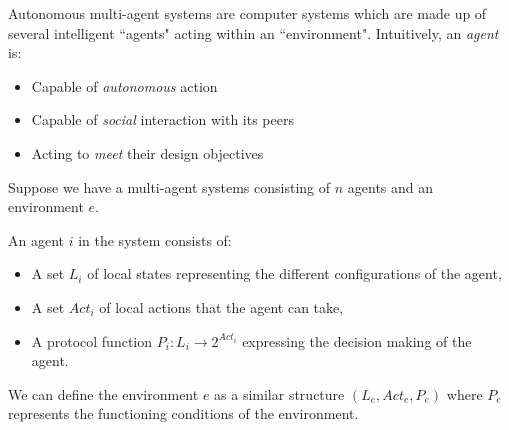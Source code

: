 \documentclass[12]{article}
\newenvironment{definition}[1][Definition]{\begin{trivlist}
\item[\hskip \labelsep {\bfseries #1}]}{\end{trivlist}}
\begin{document}
Autonomous multi-agent systems are computer systems which are made up of several intelligent ``agents" acting within an ``environment". 
Intuitively, an \textit{agent} is: 
\begin{itemize}
\item Capable of \textit{autonomous} action 
\item Capable of \textit{social} interaction with its peers
\item Acting to \textit{meet} their design objectives 
\end{itemize}
 
Suppose we have a multi-agent systems consisting of $n$ agents and an environment $e$.
\begin{definition} 
An agent $i$ in the system consists of: 
\begin{itemize}
\item A set $L_i$ of local states representing the different configurations of the agent,
\item A set $Act_i$ of local actions that the agent can take,
\item A protocol function $P_i : L_i \rightarrow 2^{Act_i} $ expressing the decision making of the agent.
\end{itemize} 
\end{definition}

We can define the environment $e$ as a similar structure $(L_e, Act_e, P_e)$ where $P_e$ represents the functioning conditions of the environment. 
\end{document}
